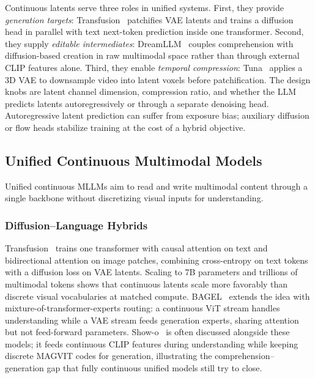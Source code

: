 Continuous latents serve three roles in unified systems. First, they provide \emph{generation targets}: Transfusion~\cite{zhou2024transfusion} patchifies VAE latents and trains a diffusion head in parallel with text next-token prediction inside one transformer. Second, they supply \emph{editable intermediates}: DreamLLM~\cite{dong2024dreamllm} couples comprehension with diffusion-based creation in raw multimodal space rather than through external CLIP features alone. Third, they enable \emph{temporal compression}: Tuna~\cite{liu2025tuna} applies a 3D VAE to downsample video into latent voxels before patchification. The design knobs are latent channel dimension, compression ratio, and whether the LLM predicts latents autoregressively or through a separate denoising head. Autoregressive latent prediction can suffer from exposure bias; auxiliary diffusion or flow heads stabilize training at the cost of a hybrid objective.

\subsection{Unified Continuous Multimodal Models}
\label{subsec:unified-continuous}

Unified continuous MLLMs aim to read and write multimodal content through a single backbone without discretizing visual inputs for understanding.

\subsubsection{Diffusion--Language Hybrids}
\label{subsubsec:diffusion-hybrid}

Transfusion~\cite{zhou2024transfusion} trains one transformer with causal attention on text and bidirectional attention on image patches, combining cross-entropy on text tokens with a diffusion loss on VAE latents. Scaling to 7B parameters and trillions of multimodal tokens shows that continuous latents scale more favorably than discrete visual vocabularies at matched compute. BAGEL~\cite{deng2025bagel} extends the idea with mixture-of-transformer-experts routing: a continuous ViT stream handles understanding while a VAE stream feeds generation experts, sharing attention but not feed-forward parameters. Show-o~\cite{xie2025show} is often discussed alongside these models; it feeds continuous CLIP features during understanding while keeping discrete MAGVIT codes for generation, illustrating the comprehension--generation gap that fully continuous unified models still try to close.

